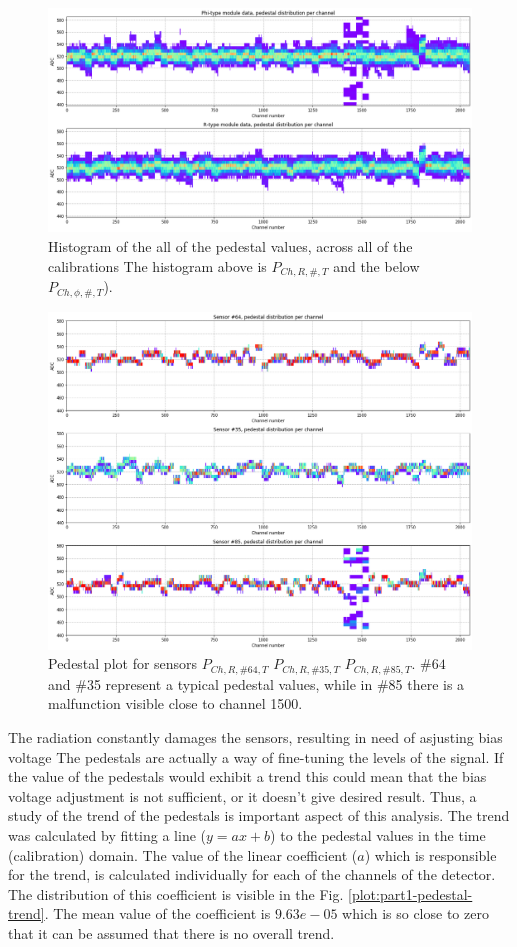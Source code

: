 \begin{figure}
    \centering
    \includegraphics[width=0.5\linewidth]{figures/chapter4/calib_analysis/Part1-r-phi-pedestals.png}
    \caption{Histogram of the all of the pedestal values, across all of the calibrations The histogram above is $P_{Ch, R, \#, T}$ and the below $P_{Ch, \phi, \#, T}$).}
    \label{plot:part1-r-phi-pedestals}
\end{figure}


\begin{figure}
    \centering
    \includegraphics[width=0.5\linewidth]{figures/chapter4/calib_analysis/Part1-outliers-pedestals-cases.png}
    \caption{Pedestal plot for sensors $P_{Ch, R, \#64, T}$ $P_{Ch, R, \#35, T}$ $P_{Ch, R, \#85, T}$. $\#64$ and \#35 represent a typical pedestal values, while in \#85 there is a malfunction visible close to channel 1500.}
    \label{plot:par1-pedestal-sensors}
\end{figure}

The radiation constantly damages the sensors, resulting in need of asjusting bias voltage
The pedestals are actually a way of fine-tuning the levels of the signal. If the value of the pedestals would exhibit a trend this could mean that the bias voltage adjustment is not sufficient, or it doesn't give desired result. Thus, a study of the trend of the pedestals is important aspect of this analysis. The trend was calculated by fitting a line ($y=ax+b$) to the pedestal values in the time (calibration) domain. The value of the linear coefficient ($a$) which is responsible for the trend, is calculated individually for each of the channels of the detector. The distribution of this coefficient is visible in the Fig. \ref{plot:part1-pedestal-trend}. The mean value of the coefficient is $9.63e-05$ which is so close to zero that it can be assumed that there is no overall trend.

